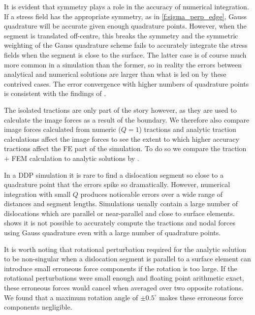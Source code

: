 \documentclass[11pt]{iopart}
\begin{document}
It is evident that symmetry plays a role in the accuracy of numerical integration. If a stress field has the appropriate symmetry, as in \cref{f:sigma_perp_edge}, Gauss quadrature will be accurate given enough quadrature points. However, when the segment is translated off-centre, this breaks the symmetry and the symmetric weighting of the Gauss quadrature scheme fails to accurately integrate the stress fields when the segment is close to the surface. The latter case is of course much more common in a simulation than the former, so in reality the errors between analytical and numerical solutions are larger than what is led on by these contrived cases. The error convergence with higher numbers of quadrature points is consistent with the findings of \cite{Queyreau}.

The isolated tractions are only part of the story however, as they are used to calculate the image forces as a result of the boundary. We therefore also compare image forces calculated from numeric ($Q = 1$) tractions and analytic traction calculations affect the image forces to see the extent to which higher accuracy tractions affect the FE part of the simulation. To do so we compare the traction + FEM calculation to analytic solutions by \citet{head1953edge}.


In a DDP simulation it is rare to find a dislocation segment so close to a quadrature point that the errors spike so dramatically. However, numerical integration with small $Q$ produces noticeable errors over a wide range of distances and segment lengths. Simulations usually contain a large number of dislocations which are parallel or near-parallel and close to surface elements.  shows it is not possible to accurately compute the tractions and nodal forces using Gauss quadrature even with a large number of quadrature points.

It is worth noting that rotational perturbation required for the analytic solution to be non-singular when a dislocation segment is parallel to a surface element can introduce small erroneous force components if the rotation is too large. If the rotational perturbations were small enough and floating point arithmetic exact, these erroneous forces would cancel when averaged over two opposite rotations. We found that a maximum rotation angle of $\pm0.5^\circ$ makes these erroneous force components negligible.
\end{document}
